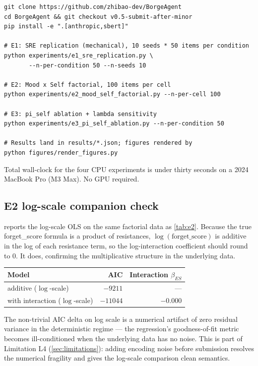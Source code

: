 \begin{verbatim}
git clone https://github.com/zhibao-dev/BorgeAgent
cd BorgeAgent && git checkout v0.5-submit-after-minor
pip install -e ".[anthropic,sbert]"

# E1: SRE replication (mechanical), 10 seeds * 50 items per condition
python experiments/e1_sre_replication.py \
       --n-per-condition 50 --n-seeds 10

# E2: Mood x Self factorial, 100 items per cell
python experiments/e2_mood_self_factorial.py --n-per-cell 100

# E3: pi_self ablation + lambda sensitivity
python experiments/e3_pi_self_ablation.py --n-per-condition 50

# Results land in results/*.json; figures rendered by
python figures/render_figures.py
\end{verbatim}

Total wall-clock for the four CPU experiments is under thirty seconds on a
2024 MacBook Pro (M3 Max). No GPU required.

\subsection*{E2 log-scale companion check}

 reports the log-scale OLS on the same factorial data
as \cref{tab:e2}. Because the true forget\_score formula is a product
of resistances, $\log(\text{forget\_score})$ is additive in the
log of each resistance term, so the log-interaction coefficient
should round to $0$. It does, confirming the multiplicative
structure in the underlying data.

\begin{center}
\small
{}
\label{tab:e2log}
\begin{tabular}{lrr}
\toprule
Model & AIC & Interaction $\beta_{ES}$ \\
\midrule
additive ($\log$-scale)         & $-9211$ & --- \\
with interaction ($\log$-scale) & $-11044$ & $-0.000$ \\
\bottomrule
\end{tabular}
\end{center}

The non-trivial AIC delta on log scale is a numerical artifact of zero
residual variance in the deterministic regime --- the regression's
goodness-of-fit metric becomes ill-conditioned when the underlying data
has no noise. This is part of Limitation L4 (\cref{sec:limitations}):
adding encoding noise before submission resolves the numerical fragility
and gives the log-scale comparison clean semantics.
